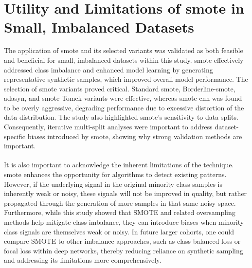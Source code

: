 \documentclass[12pt,a4paper]{report}
\begin{document}
\section{Utility and Limitations of \acrshort{smote} in Small, Imbalanced Datasets}
\noindent
The application of \acrshort{smote} and its selected variants was validated as both feasible and beneficial for small, imbalanced datasets within this study. \acrshort{smote} effectively addressed class imbalance and enhanced model learning by generating representative synthetic samples, which improved overall model performance. The selection of \acrshort{smote} variants proved critical. Standard \acrshort{smote}, Borderline-\acrshort{smote}, \acrshort{adasyn}, and \acrshort{smote}-Tomek variants were effective, whereas \acrshort{smote}-\acrshort{enn} was found to be overly aggressive, degrading performance due to excessive distortion of the data distribution. The study also highlighted \acrshort{smote}'s sensitivity to data splits. Consequently, iterative multi-split analyses were important to address dataset-specific biases introduced by \acrshort{smote}, showing why strong validation methods are important.\\
\\
It is also important to acknowledge the inherent limitations of the technique. \acrshort{smote} enhances the opportunity for algorithms to detect existing patterns. However, if the underlying signal in the original minority class samples is inherently weak or noisy, these signals will not be improved in quality, but rather propagated through the generation of more samples in that same noisy space. Furthermore, while this study showed that SMOTE and related oversampling methods help mitigate class imbalance, they can introduce biases when minority-class signals are themselves weak or noisy. In future larger cohorts, one could compare SMOTE to other imbalance approaches, such as class-balanced loss or focal loss within deep networks, thereby reducing reliance on synthetic sampling and addressing its limitations more comprehensively.
\end{document}
